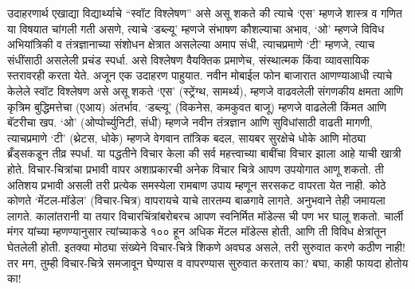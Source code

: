 उदाहरणार्थ एखाद्या विद्यार्थ्याचे “स्वॉट विश्लेषण” असे असू शकते की त्याचे ‘एस’ म्हणजे शास्त्र व गणित या विषयात चांगली गती असणे, त्याचे ‘डब्ल्यू’ म्हणजे संभाषण कौशल्याचा अभाव, ‘ओ’ म्हणजे विविध अभियांत्रिकी व तंत्रज्ञानाच्या संशोधन क्षेत्रात असलेल्या अमाप संधी, त्याचप्रमाणे ‘टी’ म्हणजे, त्याच संधींसाठी असलेली प्रचंड स्पर्धा. असे विश्लेषण वैयक्तिक प्रमाणेच, संस्थात्मक किंवा व्यावसायिक स्तरावरही करता येते. अजून एक उदाहरण पाहुयात. नवीन मोबाईल फोन बाजारात आणण्याआधी त्याचे केलेले स्वॉट विश्लेषण असे असू शकते  ‘एस’ (स्ट्रेंग्थ, सामर्थ्य), म्हणजे वाढवलेली संगणकीय क्षमता आणि कृत्रिम बुद्धिमत्तेचा (एआय) अंतर्भाव.  ‘डब्ल्यू’ (विकनेस, कमकुवत बाजू) म्हणजे वाढलेली किंमत आणि बॅटरीचा खप. ‘ओ’ (ओप्पोर्च्युनिटी, संधी)  म्हणजे नवीन तंत्रज्ञान आणि सुविधांसाठी वाढती मागणी, त्याचप्रमाणे  ‘टी’ (थ्रेटस, धोके) म्हणजे  वेगवान तांत्रिक बदल, सायबर सुरक्षेचे धोके आणि मोठ्या ब्रँड्सकडून तीव्र स्पर्धा. या पद्धतीने विचार केला की सर्व महत्त्वाच्या बाबींचा विचार झाला आहे याची खात्री होते.
विचार-चित्रांचा प्रभावी वापर
अशाप्रकारची अनेक विचार चित्रे आपण उपयोगात आणू शकतो. ती अतिशय प्रभावी असली तरी प्रत्येक समस्येला रामबाण उपाय म्हणून सरसकट वापरता येत नाही. कोठे कोणते ‘मेंटल-मॉडेल’ (विचार-चित्र) वापरायचे याचे तारतम्य बाळगावे लागते. अनुभवाने तेही जमायला लागते. कालांतरानी या तयार विचारचिंत्रांबरोबरच आपण स्वनिर्मित मॉडेल्स ची पण भर घालू शकतो. चार्ली मंगर यांच्या म्हणण्यानुसार त्यांच्याकडे १०० हून अधिक मेंटल मॉडेल्स होती, आणि ती विविध क्षेत्रांतून घेतलेली होती. इतक्या मोठ्या संख्येने विचार-चित्रे शिकणे अवघड असले, तरी सुरुवात करणे कठीण नाही! तर मग, तुम्ही विचार-चित्रे समजावून घेण्यास व वापरण्यास सुरुवात करताय का? बघा, काही फायदा होतोय का!
